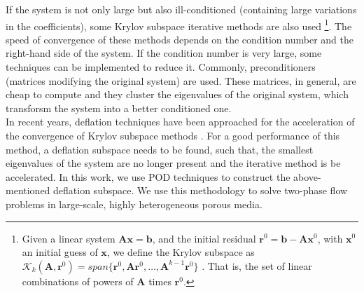 \documentclass[a4paper,10pt]{article}
\begin{document}
If the system is not only large but also ill-conditioned (containing large variations in the coefficients), some Krylov subspace iterative
methods are also used \footnote{Given a linear system $\mathbf{A}\mathbf{x}=\mathbf{b}$, and the initial residual $\mathbf{r}^0=\mathbf{b}-\mathbf{A}\mathbf{x}^0$, with $\mathbf{x}^0$ an initial guess of $\mathbf{x}$, we define the Krylov subspace as
$\mathcal{K}_k(\mathbf{A},\mathbf{r}^0)=span\{\mathbf{r}^0,\mathbf{A}\mathbf{r}^0,\dots,\mathbf{A}^{k-1}\mathbf{r}^0\}$ \cite{Saad00}. That is, the set of linear combinations of powers of $\mathbf{A}$ times $\mathbf{r}^0$. }.  The speed of convergence of these 
methods depends on the condition number and the right-hand side of the system. If the condition 
number is very large, some techniques can be implemented to reduce it. Commonly, preconditioners (matrices modifying the original system) are used. These matrices, in 
general, are cheap to compute and they cluster the eigenvalues of the original system, which transforsm the system into a better conditioned one.\\ In recent years, deflation techniques have been approached for the acceleration of the convergence of Krylov subspace methods \cite{Vuik99,Vuik02,Tang08,Tang09,Kahl17}. For a good performance of this 
method, a deflation subspace needs to be found, such that, the smallest eigenvalues of the 
system are no longer present and the iterative method is be accelerated. In this work, we use POD techniques to 
construct the above-mentioned deflation subspace. We use this methodology to solve two-phase flow problems in large-scale, highly heterogeneous porous media. \\
\small
 
 \newpage
 
\end{document}
